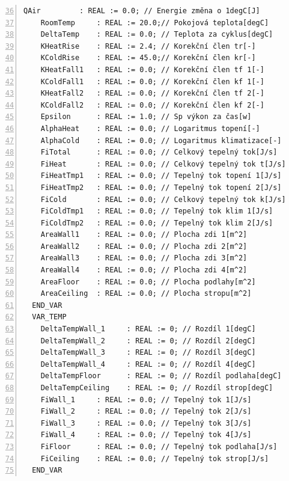 \pagebreak
\begin{lstlisting}[language=ST, breaklines=true, numbers=left, firstnumber=36, numberstyle=\small, numbersep=10pt, frame=single, basicstyle=\ttfamily\small]
    QAir         : REAL := 0.0; // Energie změna o 1degC[J]
    RoomTemp     : REAL := 20.0;// Pokojová teplota[degC]
    DeltaTemp    : REAL := 0.0; // Teplota za cyklus[degC]
    KHeatRise    : REAL := 2.4; // Korekční člen tr[-]
    KColdRise    : REAL := 45.0;// Korekční člen kr[-]
    KHeatFall1   : REAL := 0.0; // Korekční člen tf 1[-]
    KColdFall1   : REAL := 0.0; // Korekční člen kf 1[-]
    KHeatFall2   : REAL := 0.0; // Korekční člen tf 2[-]
    KColdFall2   : REAL := 0.0; // Korekční člen kf 2[-]
    Epsilon      : REAL := 1.0; // Sp výkon za čas[w]
    AlphaHeat    : REAL := 0.0; // Logaritmus topení[-]
    AlphaCold    : REAL := 0.0; // Logaritmus klimatizace[-]
    FiTotal      : REAL := 0.0; // Celkový tepelný tok[J/s]
    FiHeat       : REAL := 0.0; // Celkový tepelný tok t[J/s]
    FiHeatTmp1   : REAL := 0.0; // Tepelný tok topení 1[J/s]
    FiHeatTmp2   : REAL := 0.0; // Tepelný tok topení 2[J/s]
    FiCold       : REAL := 0.0; // Celkový tepelný tok k[J/s]
    FiColdTmp1   : REAL := 0.0; // Tepelný tok klim 1[J/s]
    FiColdTmp2   : REAL := 0.0; // Tepelný tok klim 2[J/s]
    AreaWall1    : REAL := 0.0; // Plocha zdi 1[m^2]
    AreaWall2    : REAL := 0.0; // Plocha zdi 2[m^2]
    AreaWall3    : REAL := 0.0; // Plocha zdi 3[m^2]
    AreaWall4    : REAL := 0.0; // Plocha zdi 4[m^2]
    AreaFloor    : REAL := 0.0; // Plocha podlahy[m^2]
    AreaCeiling  : REAL := 0.0; // Plocha stropu[m^2]
  END_VAR
  VAR_TEMP
    DeltaTempWall_1     : REAL := 0; // Rozdíl 1[degC]
    DeltaTempWall_2     : REAL := 0; // Rozdíl 2[degC]
    DeltaTempWall_3     : REAL := 0; // Rozdíl 3[degC]
    DeltaTempWall_4     : REAL := 0; // Rozdíl 4[degC]
    DeltaTempFloor      : REAL := 0; // Rozdíl podlaha[degC]
    DeltaTempCeiling    : REAL := 0; // Rozdíl strop[degC]
    FiWall_1     : REAL := 0.0; // Tepelný tok 1[J/s]
    FiWall_2     : REAL := 0.0; // Tepelný tok 2[J/s]
    FiWall_3     : REAL := 0.0; // Tepelný tok 3[J/s]
    FiWall_4     : REAL := 0.0; // Tepelný tok 4[J/s]
    FiFloor      : REAL := 0.0; // Tepelný tok podlaha[J/s]
    FiCeiling    : REAL := 0.0; // Tepelný tok strop[J/s]
  END_VAR
\end{lstlisting}
\pagebreak
